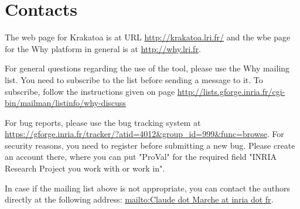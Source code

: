 \documentclass[a4paper,11pt,twoside,openright]{report}
\begin{document}
\section{Contacts}

The web page for Krakatoa is at URL \url{http://krakatoa.lri.fr/} and
the wbe page for the Why platform in general is at
\url{http://why.lri.fr}.

For general questions regarding the use of the tool, please use the
Why mailing list. You need to subscribe to the list before sending a
message to it. To subscribe, follow the instructions given on page
\url{http://lists.gforge.inria.fr/cgi-bin/mailman/listinfo/why-discuss}

For bug reports, please use the bug tracking system at
\url{https://gforge.inria.fr/tracker/?atid=4012&group_id=999&func=browse}. For
security reasons, you need to register before submitting a new
bug. Please create an account there, where you can put "ProVal" for
the required field "INRIA Research Project you work with or work in".

In case if the mailing list above is not appropriate, you can contact
the authors directly at the following address: \url{mailto:Claude dot
  Marche at inria dot fr}.

\cleardoublepage


%

\cleardoublepage

\printindex
\cleardoublepage
\end{document}

